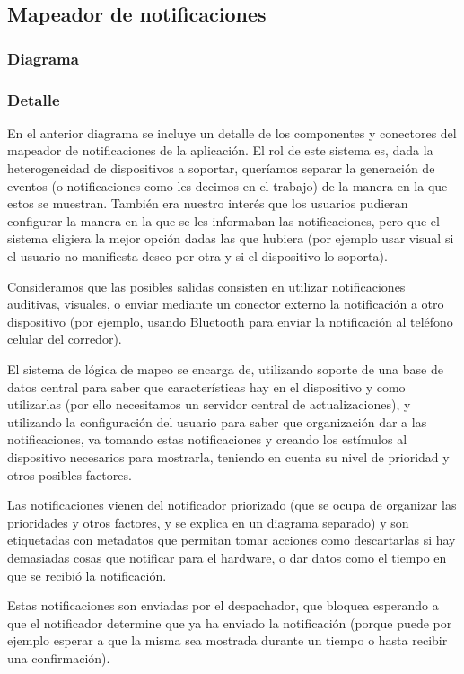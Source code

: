 \subsection{Mapeador de notificaciones}
\subsubsection{Diagrama}


\subsubsection{Detalle}

En el anterior diagrama se incluye un detalle de los componentes y
conectores del mapeador de notificaciones de la aplicación. El rol
de este sistema es, dada la heterogeneidad de dispositivos a soportar,
queríamos separar la generación de eventos (o notificaciones como les
decimos en el trabajo) de la manera en la que estos se muestran. 
También era nuestro interés que los usuarios pudieran configurar la
manera en la que se les informaban las notificaciones, pero que el
sistema eligiera la mejor opción dadas las que hubiera (por ejemplo
usar visual si el usuario no manifiesta deseo por otra y si el 
dispositivo lo soporta).

Consideramos que las posibles salidas consisten en utilizar 
notificaciones auditivas, visuales, o enviar mediante un conector
externo la notificación a otro dispositivo (por ejemplo, usando
Bluetooth para enviar la notificación al teléfono celular del 
corredor).

El sistema de lógica de mapeo se encarga de, utilizando soporte de
una base de datos central para saber que características hay en
el dispositivo y como utilizarlas (por ello necesitamos un servidor
central de actualizaciones), y utilizando la configuración del usuario
para saber que organización dar a las notificaciones, va tomando 
estas notificaciones y creando los estímulos al dispositivo 
necesarios para mostrarla, teniendo en cuenta su nivel de prioridad 
y otros posibles factores.

Las notificaciones vienen del notificador priorizado (que se ocupa de
organizar las prioridades y otros factores, y se explica en un 
diagrama separado) y son etiquetadas con metadatos que permitan 
tomar acciones como descartarlas si hay demasiadas cosas que notificar
para el hardware, o dar datos como el tiempo en que se recibió la
notificación. 

Estas notificaciones son enviadas por el despachador, que bloquea
esperando a que el notificador determine que ya ha enviado la 
notificación (porque puede por ejemplo esperar a que la misma sea
mostrada durante un tiempo o hasta recibir una confirmación).
